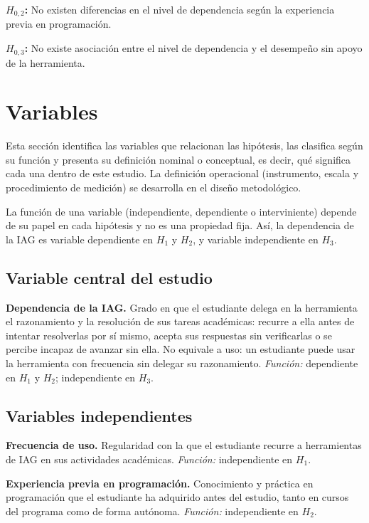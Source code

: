 \documentclass[12pt,a4paper,oneside]{report}
\begin{document}
\textbf{$H_{0,2}$:} No existen diferencias en el nivel de dependencia según la experiencia previa en programación.

\textbf{$H_{0,3}$:} No existe asociación entre el nivel de dependencia y el desempeño sin apoyo de la herramienta.

\chapter{Variables}

Esta sección identifica las variables que relacionan las hipótesis, las clasifica según su función y presenta su definición nominal o conceptual, es decir, qué significa cada una dentro de este estudio. La definición operacional (instrumento, escala y procedimiento de medición) se desarrolla en el diseño metodológico.

La función de una variable (independiente, dependiente o interviniente) depende de su papel en cada hipótesis y no es una propiedad fija. Así, la dependencia de la IAG es variable dependiente en $H_1$ y $H_2$, y variable independiente en $H_3$.

\section{Variable central del estudio}

\textbf{Dependencia de la IAG.} Grado en que el estudiante delega en la herramienta el razonamiento y la resolución de sus tareas académicas: recurre a ella antes de intentar resolverlas por sí mismo, acepta sus respuestas sin verificarlas o se percibe incapaz de avanzar sin ella. No equivale a uso: un estudiante puede usar la herramienta con frecuencia sin delegar su razonamiento. \textit{Función:} dependiente en $H_1$ y $H_2$; independiente en $H_3$.

\section{Variables independientes}

\textbf{Frecuencia de uso.} Regularidad con la que el estudiante recurre a herramientas de IAG en sus actividades académicas. \textit{Función:} independiente en $H_1$.

\textbf{Experiencia previa en programación.} Conocimiento y práctica en programación que el estudiante ha adquirido antes del estudio, tanto en cursos del programa como de forma autónoma. \textit{Función:} independiente en $H_2$.
\end{document}
